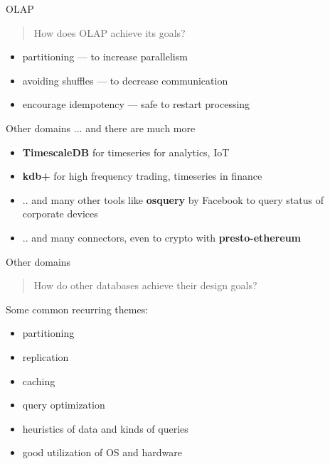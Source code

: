 \documentclass[t,pdf]{beamer}
\begin{document}
\begin{frame}{OLAP}
\begin{quote}
How does OLAP achieve its goals?
\end{quote}

\begin{itemize}
    \item partitioning — to increase parallelism
    \item avoiding shuffles — to decrease communication
    \item encourage idempotency — safe to restart processing
\end{itemize}
\end{frame}

\begin{frame}{Other domains}
... and there are much more

\begin{itemize}
    \item \textbf{TimescaleDB} for timeseries for analytics, IoT
    \item \textbf{kdb+} for high frequency trading, timeseries in finance
    \item .. and many other tools like \textbf{osquery} by Facebook to query status of corporate devices 
    \item .. and many connectors, even to crypto with \textbf{presto-ethereum}
\end{itemize}
\end{frame}

\begin{frame}{Other domains}
\begin{quote}
How do other databases achieve their design goals?
\end{quote}

Some common recurring themes:
\begin{itemize}
    \item partitioning
    \item replication
    \item caching
    \item query optimization
    \item heuristics of data and kinds of queries
    \item good utilization of OS and hardware
\end{itemize}
\end{frame}
\end{document}
